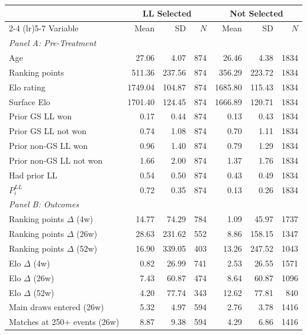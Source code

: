 \begin{tabular}{p{4cm} rrr rrr}
\toprule
 & \multicolumn{3}{c}{LL Selected} & \multicolumn{3}{c}{Not Selected} \\
\cmidrule(lr){2-4} \cmidrule(lr){5-7}
Variable & Mean & SD & $N$ & Mean & SD & $N$ \\
\midrule
\multicolumn{7}{l}{\textit{Panel A: Pre-Treatment}} \\
\quad Age & 27.06 & 4.07 & 874 & 26.46 & 4.38 & 1834 \\
\quad Ranking points & 511.36 & 237.56 & 874 & 356.29 & 223.72 & 1834 \\
\quad Elo rating & 1749.04 & 104.87 & 874 & 1685.80 & 115.43 & 1834 \\
\quad Surface Elo & 1701.40 & 124.45 & 874 & 1666.89 & 120.71 & 1834 \\
\quad Prior GS LL won & 0.17 & 0.44 & 874 & 0.13 & 0.43 & 1834 \\
\quad Prior GS LL not won & 0.74 & 1.08 & 874 & 0.70 & 1.11 & 1834 \\
\quad Prior non-GS LL won & 0.96 & 1.40 & 874 & 0.79 & 1.29 & 1834 \\
\quad Prior non-GS LL not won & 1.66 & 2.00 & 874 & 1.37 & 1.76 & 1834 \\
\quad Had prior LL & 0.54 & 0.50 & 874 & 0.43 & 0.49 & 1834 \\
\quad $P_i^{LL}$ & 0.72 & 0.35 & 874 & 0.13 & 0.26 & 1834 \\
\midrule
\multicolumn{7}{l}{\textit{Panel B: Outcomes}} \\
\quad Ranking points $\Delta$ (4w) & 14.77 & 74.29 & 784 & 1.09 & 45.97 & 1737 \\
\quad Ranking points $\Delta$ (26w) & 28.63 & 231.62 & 552 & 8.86 & 158.15 & 1347 \\
\quad Ranking points $\Delta$ (52w) & 16.90 & 339.05 & 403 & 13.26 & 247.52 & 1043 \\
\quad Elo $\Delta$ (4w) & 0.82 & 26.99 & 741 & 2.53 & 26.55 & 1571 \\
\quad Elo $\Delta$ (26w) & 7.43 & 60.87 & 474 & 8.64 & 60.87 & 1096 \\
\quad Elo $\Delta$ (52w) & 4.20 & 77.74 & 343 & 12.62 & 77.81 & 840 \\
\quad Main draws entered (26w) & 5.32 & 4.97 & 594 & 2.76 & 3.78 & 1416 \\
\quad Matches at 250+ events (26w) & 8.87 & 9.38 & 594 & 4.29 & 6.86 & 1416 \\
\bottomrule
\end{tabular}
